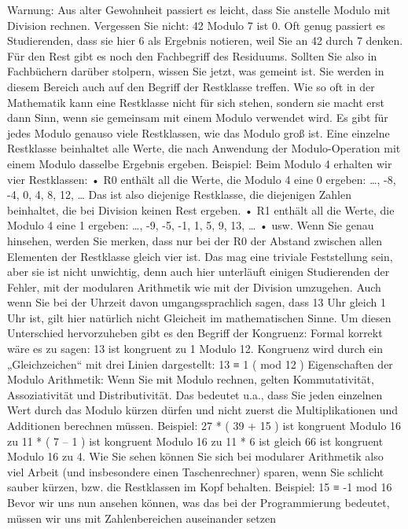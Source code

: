 Warnung: Aus alter Gewohnheit passiert es leicht, dass Sie anstelle Modulo mit Division rechnen. Vergessen Sie nicht: 42 Modulo 7 ist 0. Oft genug passiert es Studierenden, dass sie hier 6 als Ergebnis notieren, weil Sie an 42 durch 7 denken.
Für den Rest gibt es noch den Fachbegriff des Residuums. Sollten Sie also in Fachbüchern darüber stolpern, wissen Sie jetzt, was gemeint ist.
Sie werden in diesem Bereich auch auf den Begriff der Restklasse treffen. Wie so oft in der Mathematik kann eine Restklasse nicht für sich stehen, sondern sie macht erst dann Sinn, wenn sie gemeinsam mit einem Modulo verwendet wird. Es gibt für jedes Modulo genauso viele Restklassen, wie das Modulo groß ist. Eine einzelne Restklasse beinhaltet alle Werte, die nach Anwendung der Modulo-Operation mit einem Modulo dasselbe Ergebnis ergeben. 
Beispiel: Beim Modulo 4 erhalten wir vier Restklassen:
•	R0 enthält all die Werte, die Modulo 4 eine 0 ergeben: { …, -8, -4, 0, 4, 8, 12, … } Das ist also diejenige Restklasse, die diejenigen Zahlen beinhaltet, die bei Division keinen Rest ergeben.
•	R1 enthält all die Werte, die Modulo 4 eine 1 ergeben: { …, -9, -5, -1, 1, 5, 9, 13, … }
•	usw.
Wenn Sie genau hinsehen, werden Sie merken, dass nur bei der R0 der Abstand zwischen allen Elementen der Restklasse gleich vier ist. Das mag eine triviale Feststellung sein, aber sie ist nicht unwichtig, denn auch hier unterläuft einigen Studierenden der Fehler, mit der modularen Arithmetik wie mit der Division umzugehen.
Auch wenn Sie bei der Uhrzeit davon umgangssprachlich sagen, dass 13 Uhr gleich 1 Uhr ist, gilt hier natürlich nicht Gleicheit im mathematischen Sinne. Um diesen Unterschied hervorzuheben gibt es den Begriff der Kongruenz: Formal korrekt wäre es zu sagen: 13 ist kongruent zu 1 Modulo 12.
Kongruenz wird durch ein „Gleichzeichen“ mit drei Linien dargestellt: 
13 ≡ 1 ( mod 12 )
Eigenschaften der Modulo Arithmetik: Wenn Sie mit Modulo rechnen, gelten Kommutativität, Assoziativität und Distributivität. Das bedeutet u.a., dass Sie jeden einzelnen Wert durch das Modulo kürzen dürfen und nicht zuerst die Multiplikationen und Additionen berechnen müssen.
Beispiel: 
27 * ( 39 + 15 ) ist kongruent Modulo 16 zu 
11 * ( 7 – 1 ) ist kongruent Modulo 16 zu
11 * 6 ist gleich 66 ist kongruent Modulo 16 zu
4.
Wie Sie sehen können Sie sich bei modularer Arithmetik also viel Arbeit (und insbesondere einen Taschenrechner) sparen, wenn Sie schlicht sauber kürzen, bzw. die Restklassen im Kopf behalten. Beispiel: 15 ≡ -1 mod 16
Bevor wir uns nun ansehen können, was das bei der Programmierung bedeutet, müssen wir uns mit Zahlenbereichen auseinander setzen
